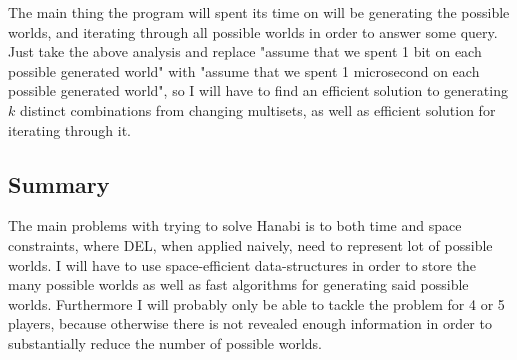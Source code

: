 The main thing the program will spent its time on will be generating the possible worlds, and iterating through all possible worlds in order to answer some query. Just take the above analysis and replace "assume that we spent 1 bit on each possible generated world" with "assume that we spent 1 microsecond on each possible generated world", so I will have to find an efficient solution to generating $k$ distinct combinations from changing multisets, as well as efficient solution for iterating through it.

\subsection{Summary}
The main problems with trying to solve Hanabi is to both time and space constraints, where DEL, when applied naively, need to represent lot of possible worlds. 
I will have to use space-efficient data-structures in order to store the many possible worlds as well as fast algorithms for generating said possible worlds. 
Furthermore I will probably only be able to tackle the problem for 4 or 5 players, because otherwise there is not revealed enough information in order to substantially reduce the number of possible worlds.
